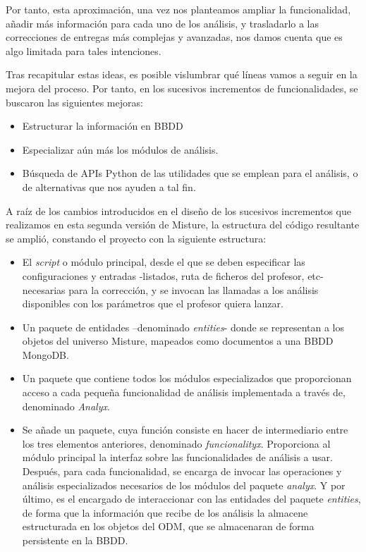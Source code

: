 Por tanto, esta aproximación, una vez nos planteamos ampliar la funcionalidad, añadir más información para cada uno de los análisis, y trasladarlo a las correcciones de entregas más complejas y avanzadas, nos damos cuenta que es algo limitada para tales intenciones.


Tras recapitular estas ideas, es posible vislumbrar qué líneas vamos a seguir en la mejora del proceso. Por tanto, en los sucesivos incrementos de funcionalidades, se buscaron las siguientes mejoras:

\begin{itemize}
\item Estructurar la información en BBDD

\item Especializar aún más los módulos de análisis.

\item Búsqueda de APIs Python de las utilidades que se emplean para el análisis, o de alternativas que nos ayuden a tal fin.
\end{itemize}

A raíz de los cambios introducidos en el diseño de los sucesivos incrementos que realizamos en esta segunda versión de Misture, la estructura del código resultante se amplió, constando el proyecto con la siguiente estructura:

\begin{itemize}
\item El \textit{script} o módulo principal, desde el que se deben especificar las configuraciones y entradas -listados, ruta de ficheros del profesor, etc- necesarias para la corrección, y se invocan las llamadas a los análisis disponibles con los parámetros que el profesor quiera lanzar.

\item Un paquete de entidades –denominado \textit{entities}- donde se representan a los objetos del universo Misture, mapeados como documentos a una BBDD MongoDB.

\item Un paquete que contiene todos los módulos especializados que proporcionan acceso a cada pequeña funcionalidad de análisis implementada a través de, denominado \textit{Analyx}.

\item Se añade un paquete, cuya función consiste en hacer de intermediario entre los tres elementos anteriores, denominado \textit{funcionalityx}. Proporciona al módulo principal la interfaz sobre las funcionalidades de análisis a usar. Después, para cada funcionalidad, se encarga de invocar las operaciones y análisis especializados necesarios de los módulos del paquete \textit{analyx}. Y por último, es el encargado de interaccionar con las entidades del paquete \textit{entities}, de forma que la información que recibe de los análisis la almacene estructurada en los objetos del ODM, que se almacenaran de forma persistente en la BBDD.
\end{itemize}

